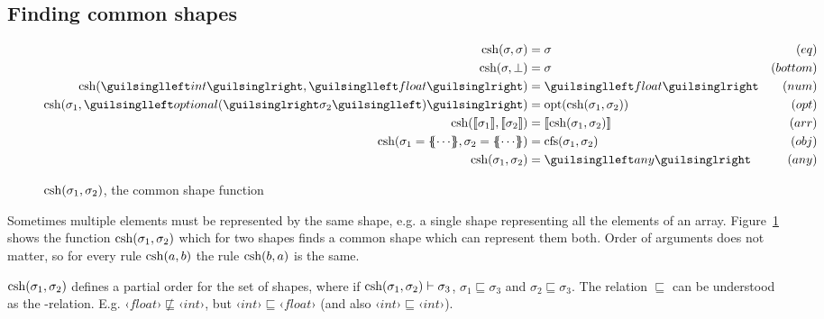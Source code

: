 \subsection{Finding common shapes}

\begin{figure}[ht!]
\begin{align*}
\csh(\sigma, \sigma)     &=  \sigma          & (eq) \\
\csh(\sigma, \bot)       &=  \sigma          & (bottom) \\
\csh(‹int›, ‹float›)     &= ‹float›          & (num) \\
\csh(\sigma_1, ‹optional(›\sigma_2‹)›) &= \opt(\csh(\sigma_1, \sigma_2))  & (opt) \\
\csh(\vect{\sigma_1}, \vect{\sigma_2}) &= \vect{\csh(\sigma_1, \sigma_2)} & (arr) \\
\csh(\sigma_1 = \recd{ \cdots }, \sigma_2 = \recd{ \cdots }) &= \cfs(\sigma_1, \sigma_2) & (obj) \\
\csh(\sigma_1, \sigma_2) &= ‹any›            & (any)
\end{align*}
\caption{$\operatorname{csh}(\sigma_1, \sigma_2)$, the common shape function}
\label{fig:csh}
\end{figure}

Sometimes multiple elements must be represented by the same shape, e.g. a single shape representing all the elements of an array. Figure~\ref{fig:csh} shows the function $\operatorname{csh}(\sigma_1, \sigma_2)$ which for two shapes finds a common shape which can represent them both. Order of arguments does not matter, so for every rule $\operatorname{csh}(a, b)$ the rule $\operatorname{csh}(b, a)$ is the same.

$\operatorname{csh}(\sigma_1, \sigma_2)$ defines a partial order for the set of shapes, where if $\operatorname{csh}(\sigma_1, \sigma_2) \vdash \sigma_3$, $\sigma_1 \sqsubseteq \sigma_3$ and $\sigma_2 \sqsubseteq \sigma_3$. The relation $\sqsubseteq$ can be understood as the -relation. E.g. $ ‹float› \not\sqsubseteq ‹int› $, but $ ‹int› \sqsubseteq ‹float› $ (and also $ ‹int› \sqsubseteq ‹int› $).

